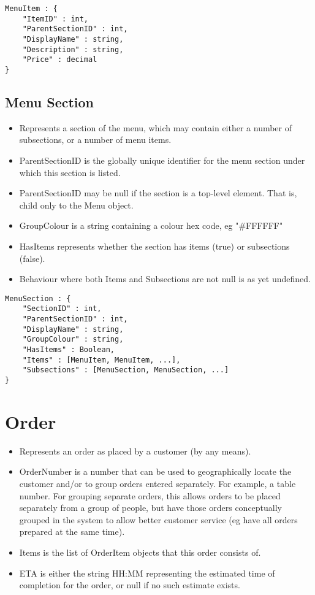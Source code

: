 \documentclass[12pt, a4paper]{article}
\begin{document}
\begin{verbatim}
MenuItem : {
	"ItemID" : int,
	"ParentSectionID" : int,
	"DisplayName" : string,
	"Description" : string,
	"Price" : decimal
}
\end{verbatim}


\subsection{Menu Section}

\begin{itemize}
\item Represents a section of the menu, which may contain either a number of subsections, or a number of menu items.
\item ParentSectionID is the globally unique identifier for the menu section under which this section is listed.
\item ParentSectionID may be null if the section is a top-level element. That is, child only to the Menu object.
\item GroupColour is a string containing a colour hex code, eg "\#FFFFFF"
\item HasItems represents whether the section has items (true) or subsections (false).
\item Behaviour where both Items and Subsections are not null is as yet undefined. 
\end{itemize}

\begin{verbatim}
MenuSection : {
	"SectionID" : int,
	"ParentSectionID" : int,
	"DisplayName" : string,
	"GroupColour" : string,
	"HasItems" : Boolean,
	"Items" : [MenuItem, MenuItem, ...],
	"Subsections" : [MenuSection, MenuSection, ...]
}
\end{verbatim}



\section{Order}

\begin{itemize}
\item Represents an order as placed by a customer (by any means).
\item OrderNumber is a number that can be used to geographically locate the customer and/or to group orders entered separately. For example, a table number.\linebreak
For grouping separate orders, this allows orders to be placed separately from a group of people, but have those orders conceptually grouped in the system to allow better customer service (eg have all orders prepared at the same time).
\item Items is the list of OrderItem objects that this order consists of.
\item ETA is either the string HH:MM representing the estimated time of completion for the order, or null if no such estimate exists.
\end{itemize}
\end{document}
